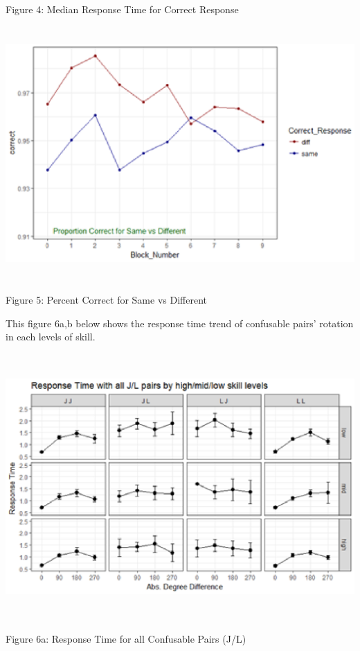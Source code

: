 \documentclass{article}
\begin{document}
	\noindent Figure 4: Median Response Time for Correct Response
	
	\noindent \includegraphics*[width=6.20in, height=3.82in, keepaspectratio=false]{image22} 
	
	\noindent Figure 5: Percent Correct for Same vs Different
	
	\noindent This figure 6a,b below shows the response time trend of confusable pairs' rotation in each levels of skill. 
	
	\noindent \includegraphics*[width=6.49in, height=4.00in, keepaspectratio=false]{image23}
	
	\noindent Figure 6a: Response Time for all Confusable Pairs (J/L) 
	
\end{document}
